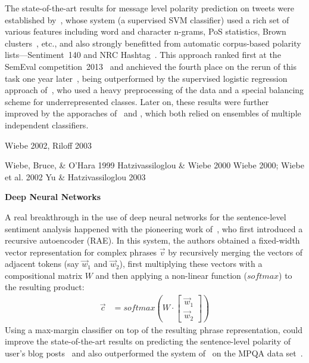 The state-of-the-art results for message level polarity prediction on
tweets were established by~\citet{Mohammad:13}, whose system (a
supervised SVM classifier) used a rich set of various features
including word and character n-grams, PoS statistics, Brown
clusters~\cite{Brown:92}, etc., and also strongly benefitted from
automatic corpus-based polarity lists---Sentiment~140 and NRC
Hashtag~\cite{Mohammad:12,Kiritchenko:14}.  This approach ranked first
at the SemEval competition~2013~\cite{Nakov:13} and anchieved the
fourth place on the rerun of this task one year
later~\cite{Rosenthal:14}, being outperformed by the supervised
logistic regression approach of~\citet{Miura:14}, who used a heavy
preprocessing of the data and a special balancing scheme for
underrepresented classes.  Later on, these results were further
improved by the apporaches of~\citet{Hagen:15} and \citet{Deriu:16},
which both relied on ensembles of multiple independent classifiers.

\cite{Nakagawa:10}

Wiebe 2002, Riloff 2003

Wiebe, Bruce, \& O'Hara 1999
Hatzivassiloglou \& Wiebe 2000
Wiebe 2000;
Wiebe et al. 2002
Yu \& Hatzivassiloglou 2003

\textbf{Deep Neural Networks}

\citet{Yessenalina:11}

A real breakthrough in the use of deep neural networks for the
sentence-level sentiment analysis happened with the pioneering work
of~\citet{Socher:11}, who first introduced a recursive autoencoder
(RAE).  In this system, the authors obtained a fixed-width vector
representation for complex phrases $\vec{v}$ by recursively merging
the vectors of adjacent tokens (say $\vec{w}_1$ and $\vec{w}_2$),
first multiplying these vectors with a compositional matrix $W$ and
then applying a non-linear function ($softmax$) to the resulting
product:
\begin{align*}
  \vec{c} &= softmax\left(W\cdot\begin{bmatrix}
  \vec{w}_1\\
  \vec{w}_2
  \end{bmatrix}\right)
\end{align*}
Using a max-margin classifier on top of the resulting phrase
representation, \citet{Socher:11} could improve the state-of-the-art
results on predicting the sentence-level polarity of user's blog
posts~\cite{Potts:10} and also outperformed the system
of~\citet{Nasukawa:03} on the MPQA data set~\cite{Wiebe:05}.

